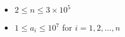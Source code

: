 \begin{itemize}
    \tightlist
    \item $2 \leq n \leq 3 \times 10^5$
    \item $1 \leq a_i \leq 10^7$ for $i = 1, 2, \ldots, n$
\end{itemize}
